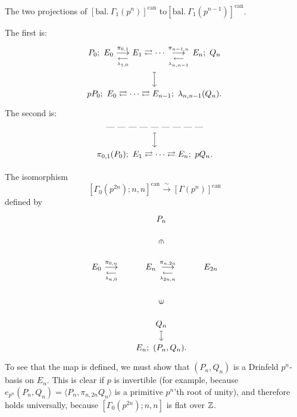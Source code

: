 \kmitem\label{item:11.3.3}
The two projections of $[\mathrm{bal.}\ \Gamma_1(p^n)]^{\mathrm{can}}$ to\linebreak $[\mathrm{bal.}\ \Gamma_1(p^{n-1})]^{\mathrm{can}}$.

The first is:
\[
\begin{tikzcd}[row sep=1.8em]
P_0;\ E_0 \kmdual{\pi_{0,1}}{\lambda_{1,0}} E_1 \rightleftarrows \cdots \kmdual{\pi_{n-1,n}}{\lambda_{n,n-1}} E_n;\ Q_n \arrow[d, mapsto] \\
pP_0;\ E_0 \rightleftarrows \cdots \rightleftarrows E_{n-1};\ \lambda_{n,n-1}(Q_n) .
\end{tikzcd}
\]
The second is:
\[
\begin{tikzcd}[row sep=1.8em]
\text{--- --- --- --- --- --- --- --- ---} \arrow[d, mapsto] \\
\pi_{0,1}(P_0);\ E_1 \rightleftarrows \cdots \rightleftarrows E_n;\ pQ_n .
\end{tikzcd}
\]

\kmitem\label{item:11.3.4}
The isomorphism
\[
[\Gamma_0(p^{2n}); n, n]^{\mathrm{can}} \xrightarrow{\ \sim\ } [\Gamma(p^n)]^{\mathrm{can}}
\]
defined by
\[
\begin{tikzcd}[row sep=1.2em, column sep=small]
& P_n \\
& \text{\rotatebox{-90}{$\in$}} \\
E_0 \kmdual{\pi_{0,n}}{\lambda_{n,0}} & E_n \kmdual{\pi_{n,2n}}{\lambda_{2n,n}} & E_{2n} \\
& \text{\rotatebox{90}{$\in$}} \\
& Q_n \arrow[d, mapsto] \\
& E_n;\ (P_n, Q_n) .
\end{tikzcd}
\]
To see that the map is defined, we must show that $(P_n, Q_n)$ is a Drinfeld $p^n$-basis on $E_n$. This is clear if $p$ is invertible (for example, because $e_{p^n}(P_n, Q_n) = \langle P_n, \pi_{n,2n} Q_n \rangle$ is a primitive $p^n$'th root of unity), and therefore holds universally, because $[\Gamma_0(p^{2n}); n, n]$ is flat over $\mathbb{Z}$.

